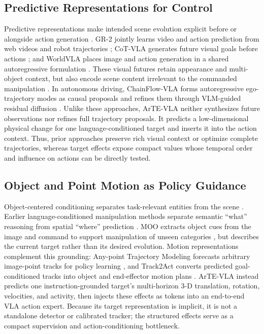 \documentclass[letterpaper,10pt,conference]{ieeeconf}
\newcommand{\method}{ArTE-VLA}
\begin{document}
\subsection{Predictive Representations for Control}

Predictive representations make intended scene evolution explicit before or alongside action generation \cite{ding2025understanding}.
GR-2 jointly learns video and action prediction from web videos and robot trajectories \cite{gr2}; CoT-VLA generates future visual goals before actions \cite{cotvla}; and WorldVLA places image and action generation in a shared autoregressive formulation \cite{worldvla}.
These visual futures retain appearance and multi-object context, but also encode scene content irrelevant to the commanded manipulation \cite{xu2026futurevla, finn2017deep}.
In autonomous driving, ChainFlow-VLA forms autoregressive ego-trajectory modes as causal proposals and refines them through VLM-guided residual diffusion \cite{wang2026chainflow}.
Unlike these approaches, \method{} neither synthesizes future observations nor refines full trajectory proposals.
It predicts a low-dimensional physical change for one language-conditioned target and inserts it into the action context.
Thus, prior approaches preserve rich visual context or optimize complete trajectories, whereas target effects expose compact values whose temporal order and influence on actions can be directly tested.

\subsection{Object and Point Motion as Policy Guidance}

Object-centered conditioning separates task-relevant entities from the scene \cite{kasu2026object,wang2026ocra}.
Earlier language-conditioned manipulation methods separate semantic ``what'' reasoning from spatial ``where'' prediction \cite{cliport}.
MOO extracts object cues from the image and command to support manipulation of unseen categories \cite{moo}, but describes the current target rather than its desired evolution.
Motion representations complement this grounding: Any-point Trajectory Modeling forecasts arbitrary image-point tracks for policy learning \cite{atm}, and Track2Act converts predicted goal-conditioned tracks into object and end-effector motion plans \cite{track2act}.
\method{} instead predicts one instruction-grounded target's multi-horizon 3-D translation, rotation, velocities, and activity, then injects these effects as tokens into an end-to-end VLA action expert.
Because its target representation is implicit, it is not a standalone detector or calibrated tracker; the structured effects serve as a compact supervision and action-conditioning bottleneck.
\end{document}
